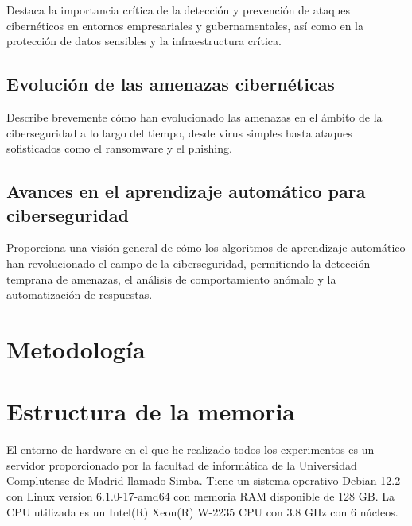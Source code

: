 Destaca la importancia crítica de la detección y prevención de ataques cibernéticos en entornos empresariales y gubernamentales, así como en la protección de datos sensibles y la infraestructura crítica.

\subsection{Evolución de las amenazas cibernéticas} \label{Subsec: 1_2_3}

Describe brevemente cómo han evolucionado las amenazas en el ámbito de la ciberseguridad a lo largo del tiempo, desde virus simples hasta ataques sofisticados como el ransomware y el phishing.

\subsection{Avances en el aprendizaje automático para ciberseguridad} \label{Subsubsec: 1_2_4}

Proporciona una visión general de cómo los algoritmos de aprendizaje automático han revolucionado el campo de la ciberseguridad, permitiendo la detección temprana de amenazas, el análisis de comportamiento anómalo y la automatización de respuestas.

\section{Metodología} \label{Subsubsec: 1_3}
\section{Estructura de la memoria} \label{Subsubsec: 1_4}
  
El entorno de hardware en el que he realizado todos los experimentos es un servidor proporcionado por la facultad de informática de la Universidad Complutense de Madrid llamado Simba. Tiene un sistema operativo Debian 12.2 con Linux version 6.1.0-17-amd64 con memoria RAM disponible de 128 GB. La CPU utilizada es un Intel(R) Xeon(R) W-2235 CPU con 3.8 GHz con 6 núcleos. 


